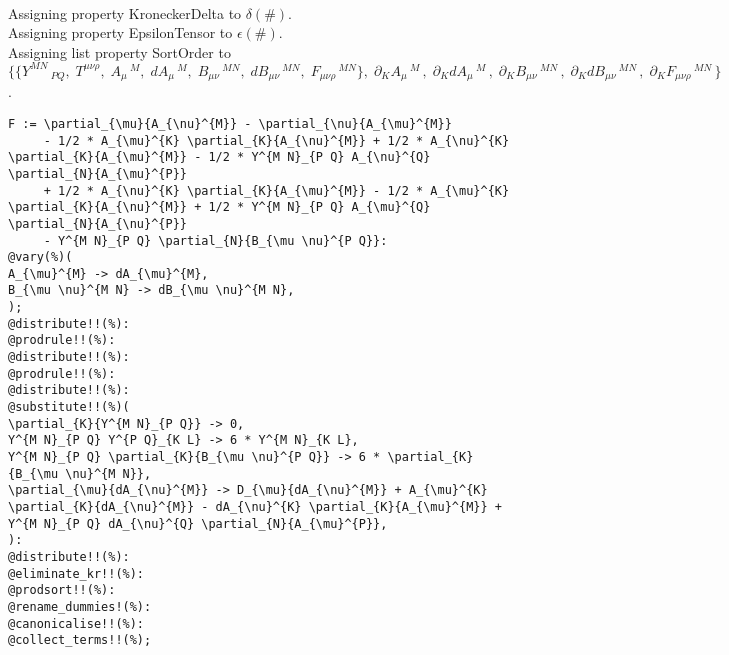 \documentclass[11pt]{article}
\begin{document}
\\
Assigning property KroneckerDelta to $\delta(\#)$.
\\
Assigning property EpsilonTensor to $\epsilon(\#)$.
\\
Assigning list property SortOrder to $\{\{{Y}^{M N}\,_{P Q},\; {T}^{\mu \nu \rho},\; {A}_{\mu}\,^{M},\; {dA}_{\mu}\,^{M},\; {B}_{\mu \nu}\,^{M N},\; {dB}_{\mu \nu}\,^{M N},\; {F}_{\mu \nu \rho}\,^{M N}\},\; {\partial}_{K}{{A}_{\mu}\,^{M}}\, ,\; {\partial}_{K}{{dA}_{\mu}\,^{M}}\, ,\; {\partial}_{K}{{B}_{\mu \nu}\,^{M N}}\, ,\; {\partial}_{K}{{dB}_{\mu \nu}\,^{M N}}\, ,\; {\partial}_{K}{{F}_{\mu \nu \rho}\,^{M N}}\, \}$.
\\
{\color[named]{Blue}\begin{verbatim}
F := \partial_{\mu}{A_{\nu}^{M}} - \partial_{\nu}{A_{\mu}^{M}} 
     - 1/2 * A_{\mu}^{K} \partial_{K}{A_{\nu}^{M}} + 1/2 * A_{\nu}^{K} \partial_{K}{A_{\mu}^{M}} - 1/2 * Y^{M N}_{P Q} A_{\nu}^{Q} \partial_{N}{A_{\mu}^{P}}
     + 1/2 * A_{\nu}^{K} \partial_{K}{A_{\mu}^{M}} - 1/2 * A_{\mu}^{K} \partial_{K}{A_{\nu}^{M}} + 1/2 * Y^{M N}_{P Q} A_{\mu}^{Q} \partial_{N}{A_{\nu}^{P}}
     - Y^{M N}_{P Q} \partial_{N}{B_{\mu \nu}^{P Q}}:
@vary(%)( 
A_{\mu}^{M} -> dA_{\mu}^{M},
B_{\mu \nu}^{M N} -> dB_{\mu \nu}^{M N},
);
@distribute!!(%):
@prodrule!!(%):
@distribute!!(%):
@prodrule!!(%):
@distribute!!(%):
@substitute!!(%)(
\partial_{K}{Y^{M N}_{P Q}} -> 0,
Y^{M N}_{P Q} Y^{P Q}_{K L} -> 6 * Y^{M N}_{K L},
Y^{M N}_{P Q} \partial_{K}{B_{\mu \nu}^{P Q}} -> 6 * \partial_{K}{B_{\mu \nu}^{M N}},
\partial_{\mu}{dA_{\nu}^{M}} -> D_{\mu}{dA_{\nu}^{M}} + A_{\mu}^{K} \partial_{K}{dA_{\nu}^{M}} - dA_{\nu}^{K} \partial_{K}{A_{\mu}^{M}} + Y^{M N}_{P Q} dA_{\nu}^{Q} \partial_{N}{A_{\mu}^{P}},
):
@distribute!!(%):
@eliminate_kr!!(%):
@prodsort!!(%):
@rename_dummies!(%):
@canonicalise!!(%):
@collect_terms!!(%);
\end{verbatim}}
\end{document}
